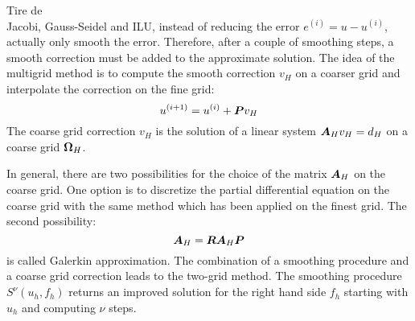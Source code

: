Tire de \cite{amg_course}\\
Jacobi, Gauss-Seidel and ILU, instead of reducing the error
$e^{(i)}=u-u^{(i)}$, actually only smooth the error. Therefore, after a couple
of smoothing steps, a smooth correction must be added to the approximate
solution. The idea of the multigrid method is to compute the smooth correction
$v_H$ on a coarser grid and interpolate the correction on the fine grid:
\begin{equation}
u^{(i+1)} = u^{(i)}+\boldsymbol{P}v_{H}
\end{equation}
The coarse grid correction $v_H$ is the solution of a linear system $\boldsymbol{A}_H
v_H = d_H$ on a coarse grid $\boldsymbol{\Omega}_H$.

In general, there are two possibilities for the choice of the matrix
$\boldsymbol{A}_H$ on the coarse grid. One option is to discretize the partial
differential equation on the coarse grid with the same method which has been
applied on the finest grid. The second possibility:
\begin{equation}
\boldsymbol{A}_H = \boldsymbol{R}\boldsymbol{A}_H \boldsymbol{P}
\end{equation}
is called Galerkin approximation. The combination of a smoothing procedure and
a coarse grid correction leads to the two-grid method. The smoothing procedure
$S^{\nu}(u_h,f_h)$ returns an improved solution for the right hand side $f_h$
starting with $u_h$ and computing $\nu$ steps.


